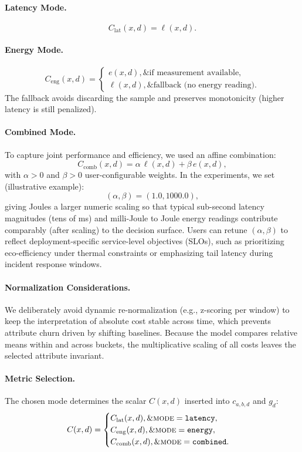 \paragraph{Latency Mode.}
\[
C_{\text{lat}}(x,d) = \ell(x,d).
\]

\paragraph{Energy Mode.}
\[
C_{\text{eng}}(x,d) =
\begin{cases}
e(x,d),\& \text{if measurement available},\\
\ell(x,d),\& \text{fallback (no energy reading)}.
\end{cases}
\]
The fallback avoids discarding the sample and preserves monotonicity (higher latency is still penalized).

\paragraph{Combined Mode.}
To capture joint performance and efficiency, we used an affine combination:
\[
C_{\text{comb}}(x,d) = \alpha \,\ell(x,d) + \beta \, e(x,d),
\]
with $\alpha > 0$ and $\beta > 0$ user-configurable weights. In the experiments, we set (illustrative example):
\[
(\alpha, \beta) = (1.0, 1000.0),
\]
giving Joules a larger numeric scaling so that typical sub-second latency magnitudes (tens of ms) and milli-Joule to Joule energy readings contribute comparably (after scaling) to the decision surface. Users can retune $(\alpha,\beta)$ to reflect deployment-specific service-level objectives (SLOs), such as prioritizing eco-efficiency under thermal constraints or emphasizing tail latency during incident response windows.

\paragraph{Normalization Considerations.}
We deliberately avoid dynamic re-normalization (e.g., z-scoring per window) to keep the interpretation of absolute cost stable across time, which prevents attribute churn driven by shifting baselines. Because the model compares relative means within and across buckets, the multiplicative scaling of all costs leaves the selected attribute invariant.

\paragraph{Metric Selection.}
The chosen mode determines the scalar $C(x,d)$ inserted into $c_{a,b,d}$ and $g_d$:
\[
C(x,d) =
\begin{cases}
C_{\text{lat}}(x,d),\& \textsc{mode}=\texttt{latency},\\
C_{\text{eng}}(x,d),\& \textsc{mode}=\texttt{energy},\\
C_{\text{comb}}(x,d),\& \textsc{mode}=\texttt{combined}.
\end{cases}
\]

